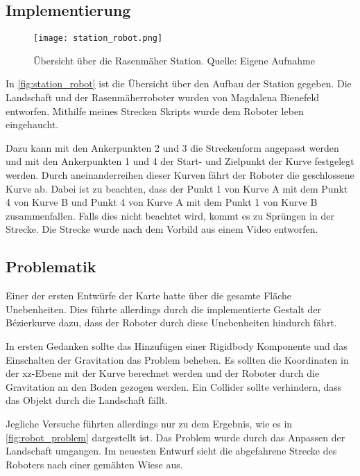 \subsection{Implementierung}
\begin{figure}[H]
	\centering
	\texttt{[image: station\_robot.png]}
	\caption[Übersicht über die Rasenmäher Station]{Übersicht über die Rasenmäher Station. Quelle: Eigene Aufnahme}
	\label{fig:station_robot}
\end{figure}

In \autoref{fig:station_robot} ist die Übersicht über den Aufbau der Station gegeben. Die Landschaft und der Rasenmäherroboter wurden von Magdalena Bienefeld entworfen. Mithilfe meines Strecken Skripts wurde dem Roboter leben eingehaucht. 

Dazu kann mit den Ankerpunkten 2 und 3 die Streckenform angepasst werden und mit den Ankerpunkten 1 und 4 der Start- und Zielpunkt der Kurve festgelegt werden. Durch aneinanderreihen dieser Kurven fährt der Roboter die geschlossene Kurve ab. Dabei ist zu beachten, dass der Punkt 1 von Kurve A mit dem Punkt 4 von Kurve B und Punkt 4 von Kurve A mit dem Punkt 1 von Kurve B zusammenfallen. Falls dies nicht beachtet wird, kommt es zu Sprüngen in der Strecke. Die Strecke wurde nach dem Vorbild aus einem Video entworfen. \cite{Unity_BezierCurve_Youtube}



\subsection{Problematik}
Einer der ersten Entwürfe der Karte hatte über die gesamte Fläche Unebenheiten. Dies führte allerdings durch die implementierte Gestalt der Bézierkurve dazu, dass der Roboter durch diese Unebenheiten hindurch fährt. 

In ersten Gedanken sollte das Hinzufügen einer Rigidbody Komponente und das Einschalten der Gravitation das Problem beheben. Es sollten die Koordinaten in der xz-Ebene mit der Kurve berechnet werden und der Roboter durch die Gravitation an den Boden gezogen werden. Ein Collider sollte verhindern, dass das Objekt durch die Landschaft fällt. 

Jegliche Versuche führten allerdings nur zu dem Ergebnis, wie es in \autoref{fig:robot_problem} dargestellt ist. Das Problem wurde durch das Anpassen der Landschaft umgangen. Im neuesten Entwurf sieht die abgefahrene Strecke des Roboters nach einer gemähten Wiese aus.

